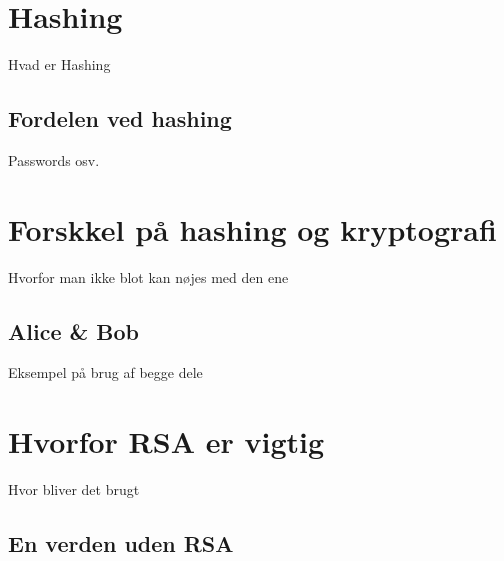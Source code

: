 \documentclass[a4paper, 12pt]{article}
\begin{document}
\section{Hashing}
Hvad er Hashing

    \subsection{Fordelen ved hashing}
    Passwords osv.



\section{Forskkel på hashing og kryptografi}
Hvorfor man ikke blot kan nøjes med den ene

    \subsection{Alice \& Bob}
    Eksempel på brug af begge dele



\section{Hvorfor RSA er vigtig}
Hvor bliver det brugt

    \subsection{En verden uden RSA}





\newpage
\printbibliography[heading=bibintoc, title={Litteratur}]
\end{document}
